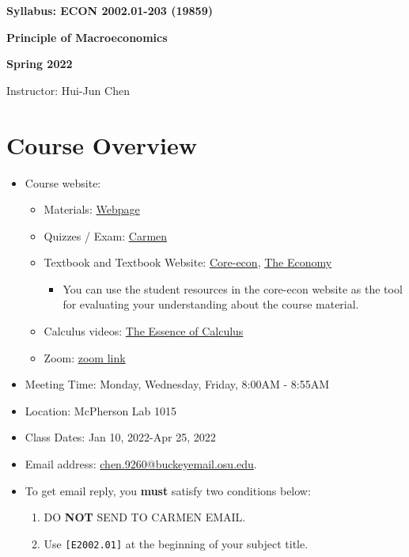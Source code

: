 \documentclass[12pt]{article}
\begin{document}
\centerline{\huge\bf Syllabus: ECON 2002.01-203 (19859)}
\medskip
\centerline{\LARGE \bf Principle of Macroeconomics}
\medskip
\centerline{\LARGE \bf Spring 2022}
\medskip
\centerline{\Large Instructor: Hui-Jun Chen}

\medskip

\section*{Course Overview}
\begin{itemize}

    \item Course website:
    \begin{itemize}
        \item Materials: \href{https://huijunchen9260.github.io/PrincipleMacroSpring2022.html}{Webpage}
        \item Quizzes / Exam: \href{https://osu.instructure.com/courses/114824}{Carmen}
        \item Textbook and Textbook Website: \href{https://www.core-econ.org/}{Core-econ}, \href{https://www.core-econ.org/the-economy/book/text/0-3-contents.html}{The Economy}
        \begin{itemize}
            \item You can use the student resources in the core-econ website as the tool for evaluating your understanding about the course material.
        \end{itemize}
        \item Calculus videos: \href{https://www.youtube.com/watch?v=WUvTyaaNkzM&list=PLZHQObOWTQDMsr9K-rj53DwVRMYO3t5Yr}{The Essence of Calculus}
        \item Zoom: \href{https://osu.zoom.us/j/2532324996?pwd=c2cweEphWFMvTVZreHJ0MHNRNUdodz09}{zoom link}
    \end{itemize}
    \item Meeting Time: Monday, Wednesday, Friday, 8:00AM - 8:55AM
    \item Location: McPherson Lab 1015
    \item Class Dates: Jan 10, 2022-Apr 25, 2022
    \item Email address: \href{chen.9260@buckeyemail.osu.edu}{chen.9260@buckeyemail.osu.edu}.
    \item To get email reply, you \textbf{must} satisfy two conditions below:
    \begin{enumerate}
        \item DO \textbf{NOT} SEND TO CARMEN EMAIL.
        \item Use \texttt{[E2002.01]} at the beginning of your subject title.

\end{enumerate}
\end{itemize}
\end{document}
